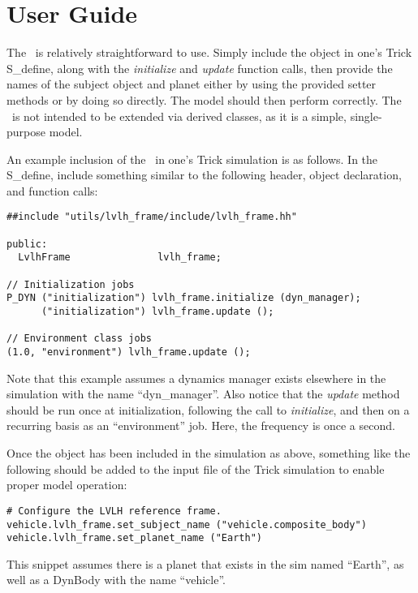 \chapter{User Guide}\label{ch:user}
The \LvlhFrameDesc\ is relatively straightforward to use. Simply include
the object in one's Trick S\_define, along with the \textit{initialize}
and \textit{update} function calls, then provide the names of the subject
object and planet either by using the provided setter methods or by
doing so directly. The model should then perform correctly. The
\LvlhFrameDesc\ is not intended to be extended via derived classes, as
it is a simple, single-purpose model.

An example inclusion of the \LvlhFrameDesc\ in one's Trick simulation is
as follows. In the S\_define, include something similar to the following
header, object declaration, and function calls:

\begin{verbatim}
##include "utils/lvlh_frame/include/lvlh_frame.hh"

public:
  LvlhFrame               lvlh_frame;

// Initialization jobs
P_DYN ("initialization") lvlh_frame.initialize (dyn_manager);
      ("initialization") lvlh_frame.update ();

// Environment class jobs
(1.0, "environment") lvlh_frame.update ();
\end{verbatim}

Note that this example assumes a dynamics manager exists elsewhere in
the simulation with the name ``dyn\_manager''. Also notice that the
\textit{update} method should be run once at initialization, following
the call to \textit{initialize}, and then on a recurring basis as an
``environment'' job. Here, the frequency is once a second.

Once the object has been included in the simulation as above, something
like the following should be added to the input file of the Trick
simulation to enable proper model operation:

\begin{verbatim}
# Configure the LVLH reference frame.
vehicle.lvlh_frame.set_subject_name ("vehicle.composite_body")
vehicle.lvlh_frame.set_planet_name ("Earth")
\end{verbatim}

This snippet assumes there is a planet that exists in the sim named
``Earth'', as well as a DynBody with the name ``vehicle''.


